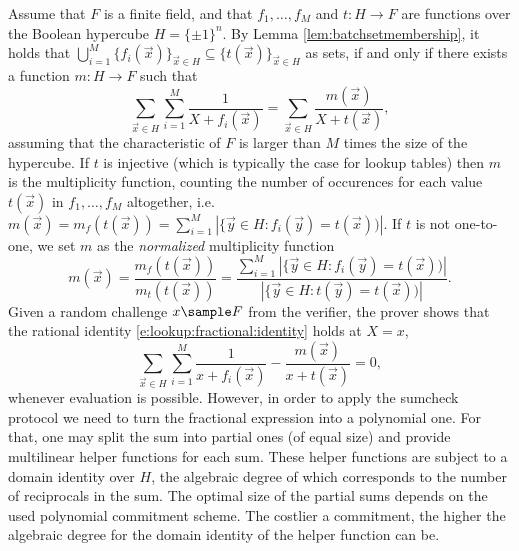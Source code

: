 \documentclass[11pt]{article}
\theoremstyle{definition}
\theoremstyle{definition}
\begin{document}
Assume that $F$ is a finite field, and that $f_1, \ldots, f_M$ and  $t: H\rightarrow F$ are functions over the Boolean hypercube $H=\{\pm 1\}^n$. 
By Lemma \ref{lem:batchsetmembership}, it holds that $\bigcup_{i=1}^M \{f_i(\vec x)\}_{\vec x\in H}\subseteq \{t(\vec x)\}_{\vec x\in H}$ as sets, if and only if there exists a function $m: H\rightarrow F$ such that
\begin{equation}
\label{e:lookup:fractional:identity}
\sum_{\vec x\in H} \sum_{i=1}^M \frac{1}{X + f_i(\vec x)} = \sum_{\vec x\in H} \frac{m(\vec x)}{X + t(\vec x)},
\end{equation}
assuming that the characteristic of $F$ is larger than $M$ times the size of the hypercube.
If $t$ is injective (which is typically the case for lookup tables) then $m$ is the multiplicity function, counting the number of occurences for each value $t(\vec x)$ in $f_1,\ldots, f_M$ altogether, i.e.
$m(\vec x) = m_f(t(\vec x)) = \sum_{i=1}^M|\{\vec y \in H: f_i(\vec y) = t(\vec x))|$.
If $t$ is not one-to-one, we set $m$ as the \textit{normalized} multiplicity function 
\begin{equation}
\label{e:lookup:m}
m(\vec x) = 
\frac{m_f(t(\vec x))}{m_t(t(\vec x))} = \frac{ \sum_{i=1}^M |\{\vec y \in H: f_i(\vec y) = t(\vec x))|}{ |\{\vec y \in H: t(\vec y) = t(\vec x))|}.
\end{equation}
Given a random challenge $x\sample F$ from the verifier, the prover shows that the rational identity \eqref{e:lookup:fractional:identity} holds at $X= x$, 
\begin{equation*}
\sum_{\vec x\in H} \sum_{i=1}^M \frac{1}{x + f_i(\vec x)} -  \frac{m(\vec x)}{x + t(\vec x)} = 0,
\end{equation*}
whenever evaluation is possible. 
However, in order to apply the sumcheck protocol we need to turn the fractional expression into a polynomial one.
For that, one may split the sum into partial ones (of equal size) and provide multilinear helper functions for each sum.
These helper functions are subject to a domain identity over $H$, the algebraic degree of which corresponds to the number of reciprocals in the sum.  
The optimal size of the partial sums depends on the used polynomial commitment scheme. 
The costlier a commitment, the higher the algebraic degree for the domain identity of the helper function can be. 
\end{document}
